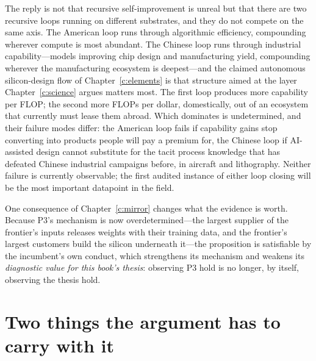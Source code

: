 The reply is not that recursive self-improvement is unreal but that there are two recursive loops running on different substrates, and they do not compete on the same axis. The American loop runs through algorithmic efficiency, compounding wherever compute is most abundant. The Chinese loop runs through industrial capability---models improving chip design and manufacturing yield, compounding wherever the manufacturing ecosystem is deepest---and the claimed autonomous silicon-design flow of Chapter~\ref{c:elements} is that structure aimed at the layer Chapter~\ref{c:science} argues matters most. The first loop produces more capability per FLOP; the second more FLOPs per dollar, domestically, out of an ecosystem that currently must lease them abroad. Which dominates is undetermined, and their failure modes differ: the American loop fails if capability gains stop converting into products people will pay a premium for, the Chinese loop if AI-assisted design cannot substitute for the tacit process knowledge that has defeated Chinese industrial campaigns before, in aircraft and lithography. Neither failure is currently observable; the first audited instance of either loop closing will be the most important datapoint in the field.

One consequence of Chapter~\ref{c:mirror} changes what the evidence is worth. Because P3's mechanism is now overdetermined---the largest supplier of the frontier's inputs releases weights with their training data, and the frontier's largest customers build the silicon underneath it---the proposition is satisfiable by the incumbent's own conduct, which strengthens its mechanism and weakens its \emph{diagnostic value for this book's thesis}: observing P3 hold is no longer, by itself, observing the thesis hold.

\section{Two things the argument has to carry with it}

